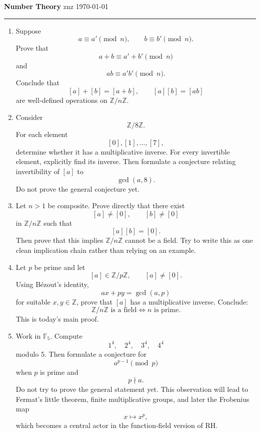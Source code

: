\documentclass[12pt]{article}
\begin{document}
\noindent
{\large\bfseries Number Theory}
\hfill
znz
\quad
\today

\hrule
\medskip

\begin{enumerate}
  \item  Suppose
        \[
        a\equiv a'\pmod n,
        \qquad
        b\equiv b'\pmod n.
        \]Prove that
        \[
        a+b\equiv a'+b'\pmod n
        \]and
        \[
        ab\equiv a'b'\pmod n.
        \]Conclude that
        \[
        [a]+[b]=[a+b],
        \qquad
        [a][b]=[ab]
        \]are well-defined operations on \(\mathbb Z/n\mathbb Z\).
  \item Consider
        \[
        \mathbb Z/8\mathbb Z.
        \]For each element
        \[
        [0],[1],\ldots,[7],
        \]determine whether it has a multiplicative inverse.
        For every invertible element, explicitly find its inverse.
        Then formulate a conjecture relating invertibility of \([a]\) to
        \[
        \gcd(a,8).
        \]Do not prove the general conjecture yet.
  \item Let \(n>1\) be composite.
        Prove directly that there exist
        \[
        [a]\neq[0],
        \qquad
        [b]\neq[0]
        \]in \(\mathbb Z/n\mathbb Z\) such that
        \[
        [a][b]=[0].
        \]Then prove that this implies \(\mathbb Z/n\mathbb Z\) cannot be a field.
        Try to write this as one clean implication chain rather than relying on an example.
  \item Let \(p\) be prime and let
        \[
        [a]\in\mathbb Z/p\mathbb Z,
        \qquad
        [a]\neq[0].
        \]Using Bézout's identity,
        \[
        ax+py=\gcd(a,p)
        \]for suitable \(x,y\in\mathbb Z\), prove that \([a]\) has a multiplicative inverse.
        Conclude:
        \[
        \boxed{
        \mathbb Z/n\mathbb Z\text{ is a field}
        \iff
        n\text{ is prime}.
        }
        \]This is today's main proof.
  \item Work in \(\mathbb F_5\).
        Compute
        \[
        1^4,\quad2^4,\quad3^4,\quad4^4
        \]modulo \(5\).
        Then formulate a conjecture for
        \[
        a^{p-1}\pmod p
        \]when \(p\) is prime and
        \[
        p\nmid a.
        \]Do not try to prove the general statement yet.
        This observation will lead to Fermat's little theorem, finite multiplicative groups, and later the Frobenius map
        \[
        x\mapsto x^p,
        \]which becomes a central actor in the function-field version of RH.
\end{enumerate}
\end{document}
